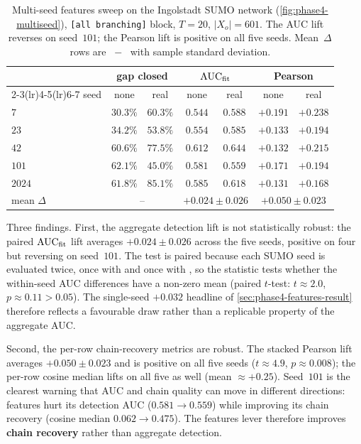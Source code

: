 \begin{table}[H]
\centering
\caption{Multi-seed features sweep on the Ingolstadt SUMO network
(\cref{fig:phase4-multiseed}), \texttt{[all branching]} block,
$T=20$, $|X_o|=601$. The AUC lift reverses on seed~$101$; the Pearson
lift is positive on all five seeds. Mean~$\Delta$ rows are
~$-$~ with sample standard deviation.}
\label{tab:phase4-multiseed}
\small
\begin{tabular}{lcccccc}
\toprule
 & \multicolumn{2}{c}{gap closed} & \multicolumn{2}{c}{$\mathrm{AUC}_{\mathrm{fit}}$} & \multicolumn{2}{c}{Pearson} \\
\cmidrule(lr){2-3}\cmidrule(lr){4-5}\cmidrule(lr){6-7}
seed & none & real & none & real & none & real \\
\midrule
$7$    & $30.3\%$ & $60.3\%$          & $0.544$ & $0.588$          & $+0.191$ & $+0.238$ \\
$23$   & $34.2\%$ & $53.8\%$          & $0.554$ & $0.585$          & $+0.133$ & $+0.194$ \\
$42$   & $60.6\%$ & $77.5\%$          & $0.612$ & $0.644$          & $+0.132$ & $+0.215$ \\
$101$  & $62.1\%$ & $\mathbf{45.0\%}$ & $0.581$ & $\mathbf{0.559}$ & $+0.171$ & $+0.194$ \\
$2024$ & $61.8\%$ & $85.1\%$          & $0.585$ & $0.618$          & $+0.131$ & $+0.168$ \\
\midrule
mean $\Delta$ & \multicolumn{2}{c}{--} & \multicolumn{2}{c}{$+0.024 \pm 0.026$} & \multicolumn{2}{c}{$\mathbf{+0.050 \pm 0.023}$} \\
\bottomrule
\end{tabular}
\end{table}

Three findings. First, the aggregate detection lift is not
statistically robust: the paired $\mathrm{AUC}_{\mathrm{fit}}$ lift averages
$+0.024 \pm 0.026$ across the five seeds, positive on four but reversing
on seed~$101$. The test is paired because each SUMO seed is evaluated
twice, once with  and once with ,
so the statistic tests whether the within-seed AUC differences have a
non-zero mean (paired $t$-test: $t \approx 2.0$, $p \approx 0.11 > 0.05$).
The single-seed $+0.032$ headline of \cref{sec:phase4-features-result}
therefore reflects a favourable draw rather than a replicable property of
the aggregate AUC.

Second, the per-row chain-recovery metrics are robust. The stacked
Pearson lift averages $+0.050 \pm 0.023$ and is positive on all five seeds
($t \approx 4.9$, $p \approx 0.008$); the per-row cosine median lifts on
all five as well (mean $\approx +0.25$). Seed~$101$ is the clearest warning
that AUC and chain quality can move in different directions: features
hurt its detection AUC ($0.581 \to 0.559$) while improving
its chain recovery (cosine median $0.062 \to 0.475$). The features lever
therefore improves \textbf{chain recovery} rather than aggregate detection.

